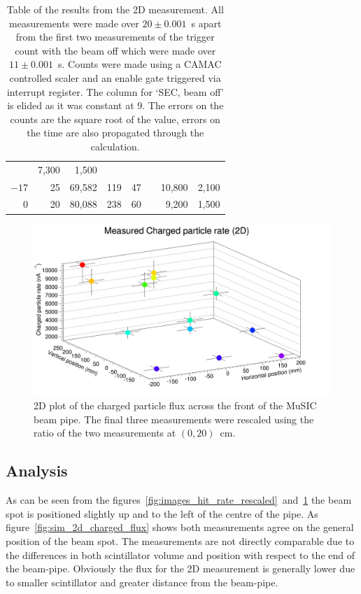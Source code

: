 \begin{table}
\begin{center}
\begin{tabular}{r|r|r|c|c|c|r@{~\(\pm\)~}r}
                                                                                           &   7,300  &  1,500 \\
       \(-17\)  &   25     &           69,582 & 119               &   47        &          &  10,800  &  2,100 \\
         0      &   20     &           80,088 & 238               &   60        &          &   9,200  &  1,500 \\
    \end{tabular}
  \end{center}
  \caption{Table of the results from the 2D measurement. All measurements were made over \( 20\pm0.001 \)~s apart from the first two measurements of the trigger count with the beam off which were made over \( 11\pm0.001 \)~s. Counts were made using a CAMAC controlled scaler and an enable gate triggered via interrupt register. The column for `SEC, beam off' is elided as it was constant at 9. The errors on the counts are the square root of the value, errors on the time are also propagated through the calculation.}
  \label{tab:2d_res}
\end{table}
 
\begin{figure}[hptb]
  \centering
  \includegraphics[width=.8\textwidth]{images/plot_generating_scripts/measured_2d_charged_flux.png}
  \caption{2D plot of the charged particle flux across the front of the MuSIC beam pipe. The final three measurements were rescaled using the ratio of the two measurements at \((0,20)\)~cm.}
  \label{fig:2D_flux}
\end{figure}
 
\subsection{Analysis} %
\label{sec:analysis}
As can be seen from the figures~\ref{fig:images_hit_rate_rescaled}~and~\ref{fig:2D_flux} the beam spot is positioned slightly up and to the left of the centre of the pipe. As figure~\ref{fig:sim_2d_charged_flux} shows both measurements agree on the general position of the beam spot. The measurements are not directly comparable due to the differences in both scintillator volume and position with respect to the end of the beam-pipe. Obviously the flux for the 2D measurement is generally lower due to smaller scintillator and greater distance from the beam-pipe.

